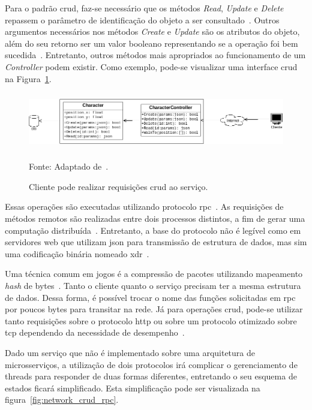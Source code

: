 Para o padrão \ac{crud}, faz-se necessário que os métodos \textit{Read}, \textit{Update} e \textit{Delete} repassem o parâmetro de identificação do objeto a ser consultado~\cite{LeckyThompson2008Nov}.
%
Outros argumentos necessários nos métodos \textit{Create} e \textit{Update} são os atributos do objeto, além do seu retorno ser um valor booleano representando se a operação foi bem sucedida~\cite{Chadwick2012Oct, LeckyThompson2008Nov}.
%
Entretanto, outros métodos mais apropriados ao funcionamento de um \textit{Controller} podem existir.
%
Como exemplo, pode-se visualizar uma interface \ac{crud} na Figura~\ref{fig:crud}.



\begin{figure}[htb!]
\caption{Cliente pode realizar requisições \ac{crud} ao serviço.}
\label{fig:crud}
\includegraphics[height=2.5cm]{img/cap2/crud.png}
\centering

Fonte: Adaptado de~\cite{albion_online_unite}.
\end{figure}



Essas operações são executadas utilizando protocolo \ac{rpc}~\cite{albion_online_unite}.
%
As requisições de métodos remotos são realizadas entre dois processos distintos, a fim de gerar uma computação distribuída~\cite{rpc}.
%
Entretanto, a base do protocolo não é legível como em servidores web que utilizam \ac{json} para transmissão de estrutura de dados, mas sim uma codificação binária nomeado \ac{xdr}~\cite{xdr}.


Uma técnica comum em jogos é a compressão de pacotes utilizando mapeamento \textit{hash} de bytes~\cite{LeckyThompson2008Nov}.
%
Tanto o cliente quanto o serviço precisam ter a mesma estrutura de dados.
%
Dessa forma, é possível trocar o nome das funções solicitadas em \ac{rpc} por poucos bytes para transitar na rede.
%
Já para operações \ac{crud}, pode-se utilizar tanto requisições sobre o protocolo \ac{http} ou sobre um protocolo otimizado sobre \ac{tcp} dependendo da necessidade de desempenho~\cite{LeckyThompson2008Nov}.

Dado um serviço que não é implementado sobre uma arquitetura de microsserviços, a utilização de dois protocolos irá complicar o gerenciamento de threads para responder de duas formas diferentes, entretando o seu esquema de estados ficará simplificado.
%
Esta simplificação pode ser visualizada na figura~\ref{fig:network_crud_rpc}.


